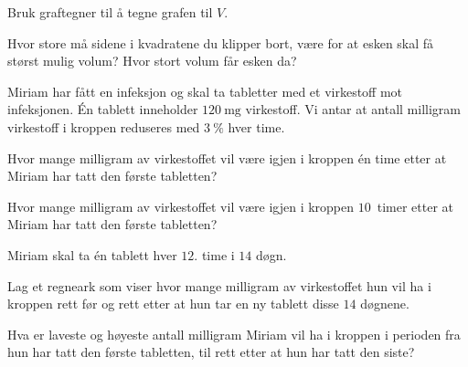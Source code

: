 \begin{oppgaver}
   Bruk graftegner til å tegne grafen til $V$.
\end{oppgaver}

\begin{oppgaver}
   Hvor store må sidene i kvadratene du klipper bort, være for at esken
    skal få størst mulig volum? Hvor stort volum får esken da?
\end{oppgaver}


\Oppgave[6]

Miriam har fått en infeksjon og skal ta tabletter med et virkestoff mot
infeksjonen. Én tablett inneholder $\SI{120}{\milli\gram}$ virkestoff. Vi antar
at antall milligram virkestoff i kroppen reduseres med $\SI{3}{\percent}$ hver
time.

\begin{oppgaver}
   Hvor mange milligram av virkestoffet vil være igjen i kroppen én time
    etter at Miriam har tatt den første tabletten?
\end{oppgaver}

\begin{oppgaver}
   Hvor mange milligram av virkestoffet vil være igjen i kroppen
    $10$~timer etter at Miriam har tatt den første tabletten?
\end{oppgaver}

Miriam skal ta én tablett hver $12$. time i $14$ døgn.

\begin{oppgaver}
   Lag et regneark som viser hvor mange milligram av virkestoffet hun
    vil ha i kroppen rett før og rett etter at hun tar en ny tablett disse $14$
    døgnene.
\end{oppgaver}

\begin{oppgaver}
   Hva er laveste og høyeste antall milligram Miriam vil ha i kroppen i
    perioden fra hun har tatt den første tabletten, til rett etter at hun har
    tatt den siste?
\end{oppgaver}
